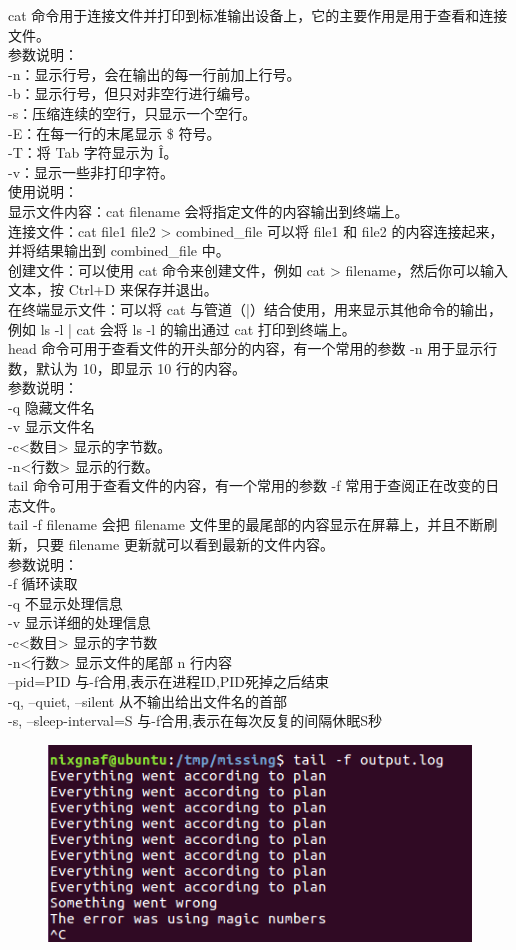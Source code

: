 \documentclass{article}
\begin{document}
\noindent cat 命令用于连接文件并打印到标准输出设备上，它的主要作用是用于查看和连接文件。\\
参数说明：\\
-n：显示行号，会在输出的每一行前加上行号。\\
-b：显示行号，但只对非空行进行编号。\\
-s：压缩连续的空行，只显示一个空行。\\
-E：在每一行的末尾显示 \$ 符号。\\
-T：将 Tab 字符显示为 \^I。\\
-v：显示一些非打印字符。\\
使用说明：\\
显示文件内容：cat filename 会将指定文件的内容输出到终端上。\\
连接文件：cat file1 file2 > combined\_file 可以将 file1 和 file2 的内容连接起来，并将结果输出到 combined\_file 中。\\
创建文件：可以使用 cat 命令来创建文件，例如 cat > filename，然后你可以输入文本，按 Ctrl+D 来保存并退出。\\
在终端显示文件：可以将 cat 与管道（|）结合使用，用来显示其他命令的输出，例如 ls -l | cat 会将 ls -l 的输出通过 cat 打印到终端上。\\

\noindent head 命令可用于查看文件的开头部分的内容，有一个常用的参数 -n 用于显示行数，默认为 10，即显示 10 行的内容。\\
参数说明：\\
-q 隐藏文件名\\
-v 显示文件名\\
-c<数目> 显示的字节数。\\
-n<行数> 显示的行数。\\

\noindent tail 命令可用于查看文件的内容，有一个常用的参数 -f 常用于查阅正在改变的日志文件。\\
tail -f filename 会把 filename 文件里的最尾部的内容显示在屏幕上，并且不断刷新，只要 filename 更新就可以看到最新的文件内容。\\
参数说明：\\
-f 循环读取\\
-q 不显示处理信息\\
-v 显示详细的处理信息\\
-c<数目> 显示的字节数\\
-n<行数> 显示文件的尾部 n 行内容\\
--pid=PID 与-f合用,表示在进程ID,PID死掉之后结束\\
-q, --quiet, --silent 从不输出给出文件名的首部\\
-s, --sleep-interval=S 与-f合用,表示在每次反复的间隔休眠S秒\\
\begin{figure}[h]
    \centering
    \includegraphics[width=0.5\linewidth]{image18.png}
\end{figure}
\end{document}
